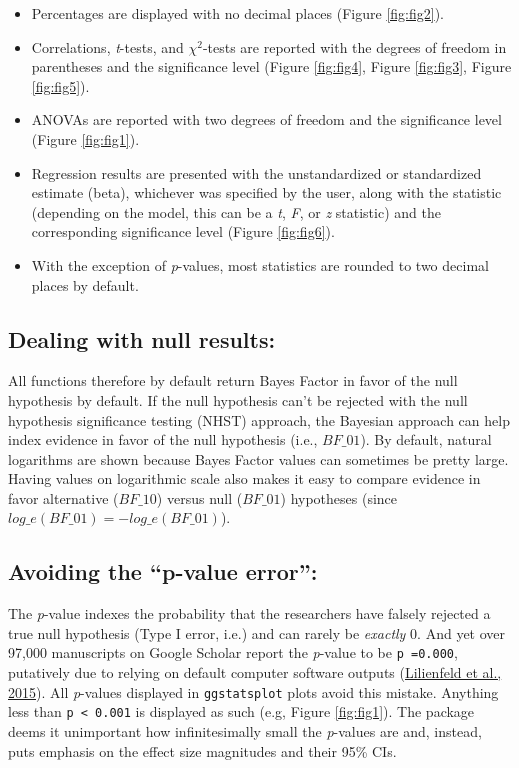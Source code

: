\documentclass[
]{article}
\begin{document}
\begin{itemize}
\item
  Percentages are displayed with no decimal places (Figure \ref{fig:fig2}).
\item
  Correlations, \emph{t}-tests, and \(\chi^2\)-tests are reported with the degrees
  of freedom in parentheses and the significance level (Figure \ref{fig:fig4},
  Figure \ref{fig:fig3}, Figure \ref{fig:fig5}).
\item
  ANOVAs are reported with two degrees of freedom and the significance level
  (Figure \ref{fig:fig1}).
\item
  Regression results are presented with the unstandardized or standardized
  estimate (beta), whichever was specified by the user, along with the
  statistic (depending on the model, this can be a \emph{t}, \emph{F}, or \emph{z} statistic)
  and the corresponding significance level (Figure \ref{fig:fig6}).
\item
  With the exception of \emph{p}-values, most statistics are rounded to two decimal
  places by default.
\end{itemize}

\hypertarget{dealing-with-null-results}{%
\subsection{\texorpdfstring{Dealing with \textbf{null results}:}{Dealing with null results:}}\label{dealing-with-null-results}}

All functions therefore by default return Bayes Factor
in favor of the null hypothesis by default. If the null hypothesis can't be
rejected with the null hypothesis significance testing (NHST) approach, the
Bayesian approach can help index evidence in favor of the null hypothesis (i.e.,
\(BF\_{01}\)). By default, natural logarithms are shown because Bayes Factor
values can sometimes be pretty large. Having values on logarithmic scale also
makes it easy to compare evidence in favor alternative (\(BF\_{10}\)) versus null
(\(BF\_{01}\)) hypotheses (since \(log\_{e}(BF\_{01}) = - log\_{e}(BF\_{01})\)).

\hypertarget{avoiding-the-p-value-error}{%
\subsection{\texorpdfstring{Avoiding the \textbf{``p-value error''}:}{Avoiding the ``p-value error'':}}\label{avoiding-the-p-value-error}}

The \emph{p}-value indexes the probability that the researchers have falsely rejected
a true null hypothesis (Type I error, i.e.) and can rarely be \emph{exactly} 0. And
yet over 97,000 manuscripts on Google Scholar report the \emph{p}-value to be \texttt{p\ =0.000},
putatively due to relying on default computer software outputs
(\protect\hyperlink{ref-lilienfeldFiftyPsychologicalPsychiatric2015}{Lilienfeld et al., 2015}). All \emph{p}-values displayed in
\texttt{ggstatsplot} plots avoid this mistake. Anything less than \texttt{p\ \textless{}\ 0.001} is
displayed as such (e.g, Figure \ref{fig:fig1}). The package deems it unimportant how
infinitesimally small the \emph{p}-values are and, instead, puts emphasis on the
effect size magnitudes and their 95\% CIs.
\end{document}

